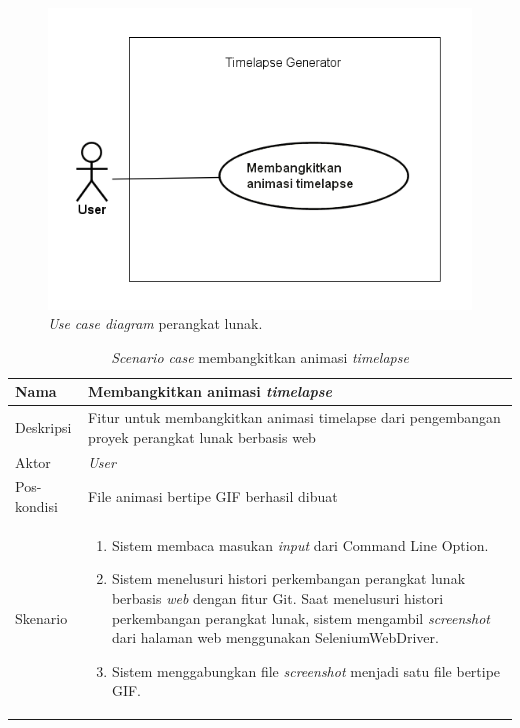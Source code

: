 \begin{figure}[H]
	\centering
		\includegraphics[scale=0.8]{Gambar/UseCaseDiagram1.png}
	\caption{\textit{Use case diagram} perangkat lunak.}
	\label{fig:uc}
\end{figure}
\begin{table}[]
    \centering
    \begin{tabular}{|p{3cm}|p{10cm}|}
    \hline
        Nama & Membangkitkan animasi \textit{timelapse}\\
    \hline
    \hline
        Deskripsi & Fitur untuk membangkitkan animasi timelapse dari pengembangan proyek perangkat lunak berbasis web\\
    \hline
        Aktor & \textit{User} \\
    \hline
        Pos-kondisi &  File animasi bertipe GIF berhasil dibuat\\
    \hline
        Skenario & 
        \begin{enumerate}
        \item Sistem membaca masukan \textit{input} dari Command Line Option.
            \item Sistem menelusuri histori perkembangan perangkat lunak berbasis \textit{web} dengan fitur
Git. Saat menelusuri histori perkembangan perangkat lunak, sistem mengambil \textit{screenshot} dari halaman web menggunakan SeleniumWebDriver.
            \item Sistem menggabungkan file \textit{screenshot} menjadi satu file bertipe GIF.
        \end{enumerate}\\
    \hline
    \end{tabular}
    \caption{\textit{Scenario case} membangkitkan animasi \textit{timelapse}}
    \label{tab:tabel_sc_animasi}
\end{table}


